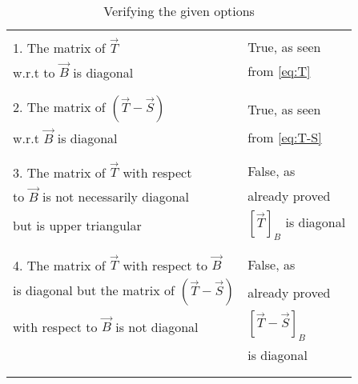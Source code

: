 \documentclass[journal,12pt]{IEEEtran}
\begin{document}
\begin{longtable}{|l|l|}
    \hline
        & \\
        1. The matrix of $\vec{T}$ & True, as seen\\
        w.r.t to $\vec{B}$ is diagonal & from \eqref{eq:T}\\
        & \\
    \hline
        & \\
        2. The matrix of $(\vec{T}-\vec{S})$ & True, as seen\\
        w.r.t $\vec{B}$ is diagonal & from \eqref{eq:T-S}\\
        & \\
    \hline
        & \\
        3. The matrix of $\vec{T}$ with respect & False, as\\
        to $\vec{B}$ is not necessarily diagonal & already proved\\
        but is upper triangular & $[\vec{T}]_B$ is diagonal\\
        & \\
    \hline
        & \\
        4. The matrix of $\vec{T}$ with respect to $\vec{B}$ & False, as\\
        is diagonal but the matrix of $(\vec{T}-\vec{S})$ & already proved\\
        with respect to $\vec{B}$ is not diagonal & $[\vec{T}-\vec{S}]_B$\\
        & is diagonal\\
        & \\
    \hline
    \caption{Verifying the given options}
    \label{tab:proof}
\end{longtable}
\end{document}
